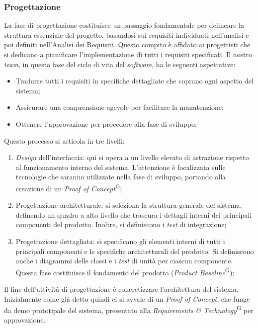 \documentclass[5pt]{article}
\begin{document}
\subsubsection{Progettazione}
La fase di progettazione costituisce un passaggio fondamentale per delineare la struttura essenziale del progetto, basandosi sui requisiti individuati nell'analisi e poi definiti nell'Analisi dei Requisiti. Questo compito è affidato ai progettisti che si dedicano a pianificare l'implementazione di tutti i requisiti specificati. Il nostro \textit{team}, in questa fase del ciclo di vita del \textit{software}, ha le seguenti aspettative:
\begin{itemize}
    \item Tradurre tutti i requisiti in specifiche dettagliate che coprano ogni aspetto del sistema;
    \item Assicurare una comprensione agevole per facilitare la manutenzione;
    \item Ottenere l'approvazione per procedere alla fase di sviluppo;
\end{itemize}
Questo processo si articola in tre livelli:
\begin{enumerate}
    \item \textit{Design} dell'interfaccia: qui si opera a un livello elevato di astrazione rispetto al funzionamento interno del sistema. L'attenzione è focalizzata sulle tecnologie che saranno utilizzate nella fase di sviluppo, portando alla creazione di un \textit{Proof of Concept}\textsuperscript{G};
    \item Progettazione architetturale: si seleziona la struttura generale del sistema, definendo un quadro a alto livello che trascura i dettagli interni dei principali componenti del prodotto. Inoltre, si definiscono i \textit{test} di integrazione;
    \item Progettazione dettagliata: si specificano gli elementi interni di tutti i principali componenti e le specifiche architetturali del prodotto. Si definiscono anche i diagrammi delle classi e i \textit{test} di unità per ciascun componente. Questa fase costituisce il fondamento del prodotto (\textit{Product Baseline}\textsuperscript{G});
\end{enumerate}
Il fine dell'attività di progettazione è concretizzare l'architettura del sistema. Inizialmente come già detto quindi ci si avvale di un \textit{Proof of Concept}, che funge da demo prototipale del sistema, presentato alla \textit{Requirements \& Technology}\textsuperscript{G} per approvazione.
\end{document}
